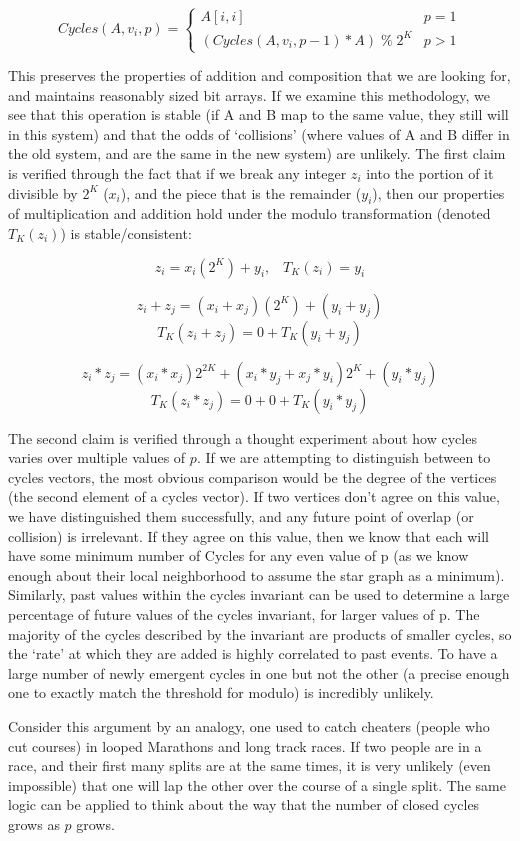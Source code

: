 $$ Cycles(A, v_i, p) = \begin{cases} 
      A[i,i] & p = 1 \\
      (Cycles(A, v_i, p-1) * A) \; \% \; 2^K  & p > 1
\end{cases}$$

This preserves the properties of addition and composition that we are looking for, and maintains reasonably sized bit arrays.
If we examine this methodology, we see that this operation is stable (if A and B map to the same value, they still will in this system) and that the odds of `collisions' (where values of A and B differ in the old system, and are the same in the new system) are unlikely.
The first claim is verified through the fact that if we break any integer $z_i$ into the portion of it divisible by $2^K$ ($x_i$), and the piece that is the remainder ($y_i$), then our properties of multiplication and addition hold under the modulo transformation (denoted $T_K(z_i)$) is stable/consistent:

$$z_i =  x_i(2^K) + y_i , \;\;\;T_K(z_i) = y_i$$

$$z_i + z_j = (x_i + x_j)(2^K) + (y_i + y_j)$$
$$T_K(z_i + z_j) = 0 + T_K(y_i + y_j)$$

$$z_i * z_j = (x_i*x_j)2^{2K} + (x_i*y_j + x_j*y_i)2^K + (y_i * y_j)$$
$$T_K(z_i * z_j) = 0 + 0 + T_K(y_i * y_j)$$

The second claim is verified through a thought experiment about how cycles varies over multiple values of $p$.
If we are attempting to distinguish between to cycles vectors, the most obvious comparison would be the degree of the vertices (the second element of a cycles vector).
If two vertices don't agree on this value, we have distinguished them successfully, and any future point of overlap (or collision) is irrelevant. 
If they agree on this value, then we know that each will have some minimum number of Cycles for any even value of p (as we know enough about their local neighborhood to assume the star graph as a minimum). 
Similarly, past values within the cycles invariant can be used to determine a large percentage of future values of the cycles invariant, for larger values of p.
The majority of the cycles described by the invariant are products of smaller cycles, so the `rate' at which they are added is highly correlated to past events.
To have a large number of newly emergent cycles in one but not the other (a precise enough one to exactly match the threshold for modulo) is incredibly unlikely.

Consider this argument by an analogy, one used to catch cheaters (people who cut courses) in looped Marathons and long track races.
If two people are in a race, and their first many splits are at the same times, it is very unlikely (even impossible) that one will lap the other over the course of a single split.
The same logic can be applied to think about the way that the number of closed cycles grows as $p$ grows.


